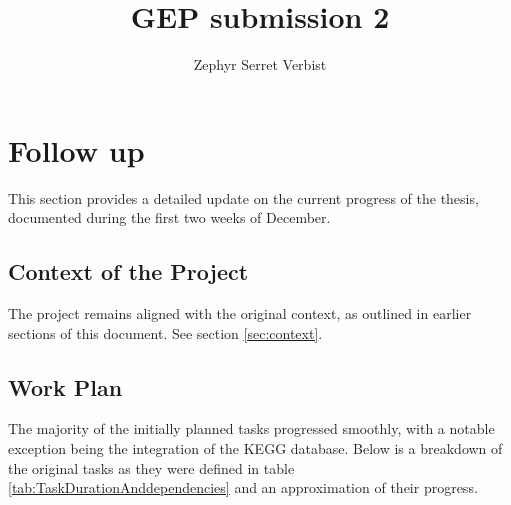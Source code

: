 \documentclass[12pt]{article}
\title{GEP submission 2}
\author{Zephyr Serret Verbist}
\begin{document}
\begin{titlepage}

\end{titlepage}

\renewcommand*\contentsname{Table of contents}
\tableofcontents
\listoffigures
\listoftables
\newpage




\section{Follow up}

This section provides a detailed update on the current progress of the thesis, documented during the first two weeks of December.

\subsection{Context of the Project}

The project remains aligned with the original context, as outlined in earlier sections of this document. See section \ref{sec:context}.

\subsection{Work Plan}

The majority of the initially planned tasks progressed smoothly, with a notable exception being the integration of the KEGG database. Below is a breakdown of the original tasks as they were defined in table \ref{tab:TaskDurationAnddependencies} and an approximation of their progress.
\end{document}
